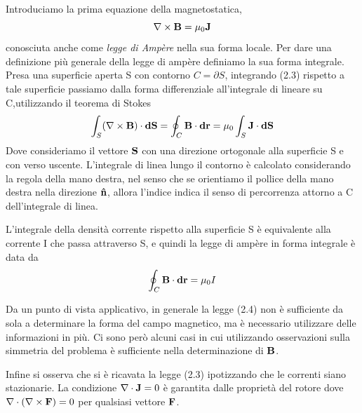 Introduciamo la prima equazione della magnetostatica,
\begin{equation}
	\nabla \times \bold{B} = \mu_0 \bold{J}
\end{equation}
conosciuta anche come \textit{legge di Amp\`ere} nella sua forma locale. Per dare una definizione pi\`u generale della legge di amp\`ere definiamo la sua forma integrale. Presa una superficie aperta S con contorno $C = \partial S$, integrando (2.3) rispetto a tale superficie passiamo dalla forma differenziale all'integrale di lineare su C,utilizzando il teorema di Stokes 
\begin{equation*}
	\int_{S} (\nabla \times \bold{B})\cdot \bold{dS} = \oint_{C} \bold{B} \cdot \bold{dr} = \mu_0 \int_{S} \bold{J} \cdot \bold{dS}
\end{equation*}
Dove consideriamo il vettore $\bold{S}$ con una direzione ortogonale alla superficie S e con verso uscente. L'integrale di linea lungo il contorno \`e calcolato considerando la regola della mano destra, nel senso che se orientiamo il pollice della mano destra nella direzione $\bold{\hat{n}}$, allora l'indice indica il senso di percorrenza attorno a C dell'integrale di linea.
\newline

L'integrale della densit\`a corrente rispetto alla superficie S \`e equivalente alla corrente I che passa attraverso S, e quindi la legge di amp\`ere in forma integrale \`e data da
\begin{equation}
	\oint_{C} \bold{B} \cdot \bold{dr} = \mu_0 I
\end{equation}

Da un punto di vista applicativo, in generale la legge (2.4) non \`e sufficiente da sola a determinare la forma del campo magnetico, ma \`e necessario utilizzare delle informazioni in pi\`u. Ci sono per\`o alcuni casi in cui utilizzando osservazioni sulla simmetria del problema \`e sufficiente nella determinazione di $\bold{B}$.

Infine si osserva che si \`e ricavata la legge (2.3) ipotizzando che le correnti siano stazionarie. La condizione  $\nabla \cdot \bold{J} = 0$ \`e garantita dalle propriet\`a del rotore dove $\nabla \cdot (\nabla \times \bold{F}) =0 $ per qualsiasi vettore $\bold{F}$.


